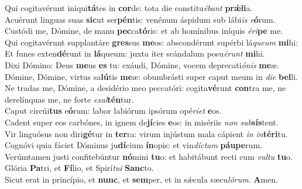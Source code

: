 Qui cogitavérunt iniqui\textbf{tá}tes in \textbf{cor}de: \ast tota die constitu\textit{é}\textit{bant} \textbf{prǽ}\textbf{li}a.\\
Acuérunt linguas suas \textbf{sic}ut ser\textbf{pén}tis: \ast venénum áspidum sub lábi\textit{is} \textit{e}\textbf{ó}rum.\\
Custódi me, Dómine, de manu \textbf{pec}ca\textbf{tó}ris: \ast et ab homínibus iníquis \textit{é}\textit{ri}\textbf{pe} me.\\
Qui cogitavérunt supplantáre \textbf{gres}sus \textbf{me}os: \ast abscondérunt supérbi lá\textit{que}\textit{um} \textbf{mi}hi:\\
Et funes exten\textbf{dé}runt in \textbf{lá}queum: \ast juxta iter scándalum posu\textit{é}\textit{runt} \textbf{mi}hi.\\
Dixi Dómino: Deus \textbf{me}us \textbf{es} tu: \ast exáudi, Dómine, vocem deprecati\textit{ó}\textit{nis} \textbf{me}æ.\\
Dómine, Dómine, virtus sa\textbf{lú}tis \textbf{me}æ: \ast obumbrásti super caput meum in \textit{di}\textit{e} \textbf{bel}li.\\
Ne tradas me, Dómine, a desidério meo peccatóri: \dag cogita\textbf{vé}runt \textbf{con}tra me, \ast ne derelínquas me, ne forte \textit{ex}\textit{al}\textbf{tén}tur.\\
Caput circúi\textbf{tus} e\textbf{ó}rum: \ast labor labiórum ipsórum opé\textit{ri}\textit{et} \textbf{e}os.\\
Cadent super eos carbónes, \dag in ignem de\textbf{jí}cies \textbf{e}os: \ast in misériis \textit{non} \textit{sub}\textbf{sís}tent.\\
Vir linguósus non diri\textbf{gé}tur in \textbf{ter}ra: \ast virum injústum mala cápient \textit{in} \textit{in}\textbf{tér}\textbf{i}tu.\\
Cognóvi quia fáciet Dóminus ju\textbf{dí}cium \textbf{ín}opis: \ast et vin\textit{díc}\textit{tam} \textbf{páu}\textbf{pe}rum.\\
Verúmtamen justi confitebúntur \textbf{nó}mini \textbf{tu}o: \ast et habitábunt recti cum \textit{vul}\textit{tu} \textbf{tu}o.\\
Glória \textbf{Pa}tri, et \textbf{Fí}lio, \ast et Spirí\textit{tu}\textit{i} \textbf{Sanc}to.\\
Sicut erat in princípio, et \textbf{nunc}, et \textbf{sem}per, \ast et in sǽcula sæcu\textit{ló}\textit{rum}. \textbf{A}men.\\
